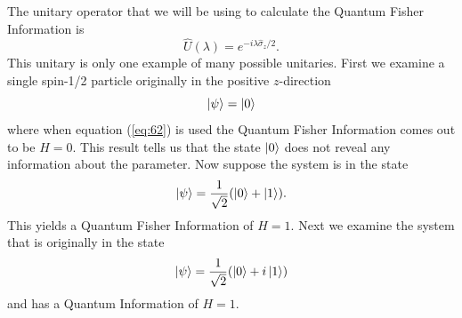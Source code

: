 \documentclass[twocolumn]{article}
\begin{document}
The unitary operator that we will be using to calculate the Quantum Fisher Information is
\begin{equation} \label{eq:69}
\hat{U}(\lambda)=e^{-i\lambda\hat{\sigma}_z/2}.
\end{equation}
This unitary is only one example of many possible unitaries. First we examine a single spin-1/2 particle originally in the positive $z$-direction
\begin{equation} \label{eq:70}
\ket{\psi}=\ket{0}
\end{equation}
where when equation (\ref{eq:62}) is used the Quantum Fisher Information comes out to be $H=0$. This result tells us that the state $\ket{0}$ does not reveal any information about the parameter. Now suppose the system is in the state
\begin{equation} \label{eq:71}
\ket{\psi}=\frac{1}{\sqrt{2}}(\ket{0}+\ket{1}).
\end{equation}
This yields a Quantum Fisher Information of $H=1$. Next we examine the system that is originally in the state
\begin{equation} \label{eq:72}
\ket{\psi}=\frac{1}{\sqrt{2}}(\ket{0}+i\ket{1})
\end{equation}
and has a Quantum Information of $H=1$.
\end{document}

